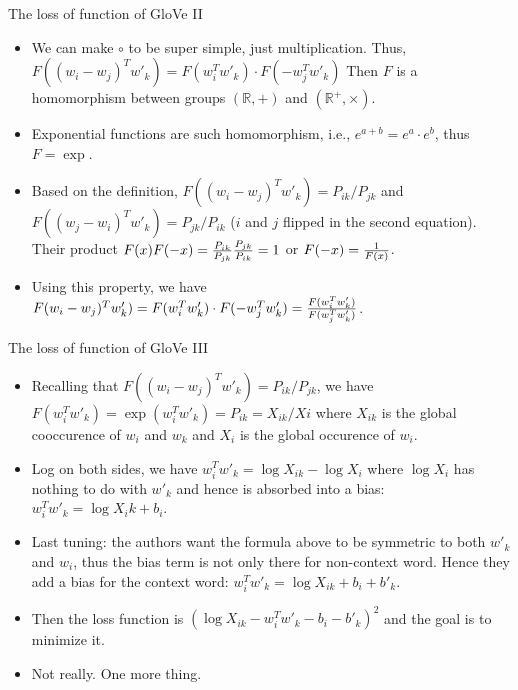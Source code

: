 \documentclass[10pt]{beamer}
\begin{document}
\begin{frame}{The loss of function of GloVe II}
\begin{itemize}[<+->]
 \item We can make $\circ$ to be super simple, just multiplication. Thus, 
 $F((w_i-w_j)^T w'_k) = F(w_i^T w'_k) \cdot F(-w_j^T w'_k)$
 Then $F$ is a homomorphism between groups $(\mathbb{R}, +)$ and $(\mathbb{R}^+, \times)$.
 \item Exponential functions are such homomorphism, i.e., $e^{a+b} = e^a \cdot e^b$, thus $F=\exp$. 
 \item Based on the definition, 
 $F((w_i-w_j)^T w'_k) = P_{ik}/P_{jk}$ and $F((w_j-w_i)^T w'_k) = P_{jk}/P_{ik}$ ($i$ and $j$ flipped in the second equation). Their product $F(x)F(-x)={P_{ik}\over P_{jk}}{P_{jk}\over P_{ik}}=1$ or $F(-x)={1\over F(x)}$. 
 \item Using this property, we have  $F(w_i-w_j)^T w'_k) = F(w_i^T w'_k) \cdot F(-w_j^T w'_k) = {F(w_i^T w'_k) \over F(w_j^Tw'_k)}$. 
\end{itemize}
\end{frame}

\begin{frame}{The loss of function of GloVe III}
\begin{itemize}[<+->]
 \item Recalling that $F( (w_i-w_j)^T w'_k) = P_{ik} / P_{jk}$, we have $F(w_i^T w'_k) = \exp(w_i^T w'_k ) =  P_{ik} = X_{ik} / X{i}$ where $X_{ik}$ is the global cooccurence of $w_i$ and $w_k$ and $X_i$ is the global occurence of $w_i$. 
 \item Log on both sides, we have $w_i^T w'_k = \log X_{ik} - \log{X_i}$ where $\log{X_i}$ has nothing to do with $w'_k$ and hence is absorbed into a bias: $w_i^T w'_k = \log{X_ik} + b_i$. 
 \item Last tuning: the authors want the formula above to be symmetric to both $w'_k$ and $w_i$, thus the bias term is not only there for non-context word. Hence they add a bias for the context word: $w_i^T w'_k = \log X_{ik} + b_i + b'_k$. 
 \item Then the loss function is $(\log X_{ik} - w_i^T w'_k - b_i - b'_k)^2$ and the goal is to minimize it. 
 \item Not really. One more thing. 
\end{itemize}
\end{frame}
\end{document}
